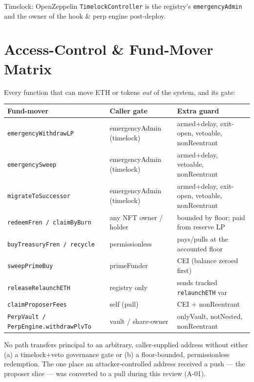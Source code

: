 \documentclass[11pt]{article}
\begin{document}
\noindent Timelock: OpenZeppelin \texttt{TimelockController} is the registry's
\texttt{emergencyAdmin} and the owner of the hook \& perp engine post-deploy.

\section{Access-Control \& Fund-Mover Matrix}

Every function that can move ETH or tokens \emph{out} of the system, and its gate:

\begin{center}\small
\begin{longtable}{p{}p{}p{}}
\toprule
\textbf{Fund-mover} & \textbf{Caller gate} & \textbf{Extra guard}\\
\midrule
\endhead
\texttt{emergencyWithdrawLP} & emergencyAdmin (timelock) & armed+delay, exit-open, vetoable, nonReentrant\\
\texttt{emergencySweep} & emergencyAdmin (timelock) & armed+delay, vetoable, nonReentrant\\
\texttt{migrateToSuccessor} & emergencyAdmin (timelock) & armed+delay, exit-open, vetoable, nonReentrant\\
\texttt{redeemFren / claimByBurn} & any NFT owner / holder & bounded by floor; paid from reserve LP\\
\texttt{buyTreasuryFren / recycle} & permissionless & pays/pulls at the accounted floor\\
\texttt{sweepPrimeBuy} & primeFunder & CEI (balance zeroed first)\\
\texttt{releaseRelaunchETH} & registry only & sends tracked \texttt{relaunchETH} var\\
\texttt{claimProposerFees} & self (pull) & CEI + nonReentrant\\
\texttt{PerpVault / PerpEngine.withdrawPlvTo} & vault / share-owner & onlyVault, notNested, nonReentrant\\
\bottomrule
\end{longtable}
\end{center}

\noindent No path transfers principal to an arbitrary, caller-supplied address without
either (a) a timelock+veto governance gate or (b) a floor-bounded, permissionless
redemption. The one place an attacker-controlled address received a push — the proposer
slice — was converted to a pull during this review (A-01).
\end{document}
